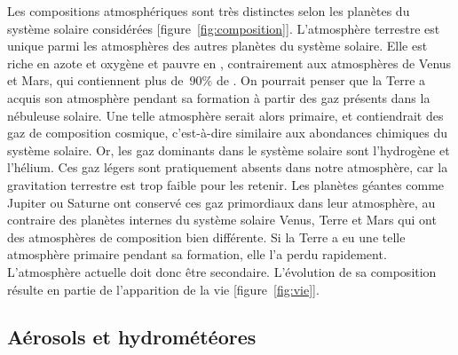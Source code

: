 
\sk
Les compositions atmosphériques sont très distinctes selon les planètes du système solaire considérées [figure~\ref{fig:composition}]. L'atmosphère terrestre est unique parmi les atmosphères des autres planètes du système solaire. Elle est riche en azote et oxygène et pauvre en \carb, contrairement aux atmosphères de Venus et Mars, qui contiennent plus de~$90\%$ de \carb. On pourrait penser que la Terre a acquis son atmosphère pendant sa formation à partir des gaz présents dans la nébuleuse solaire. Une telle atmosphère serait alors primaire, et contiendrait des gaz de composition cosmique, c'est-à-dire similaire aux abondances chimiques du système solaire. Or, les gaz dominants dans le système solaire sont l'hydrogène et l'hélium. Ces gaz légers sont pratiquement absents dans notre atmosphère, car la gravitation terrestre est trop faible pour les retenir. Les planètes géantes comme Jupiter ou Saturne ont conservé ces gaz primordiaux dans leur atmosphère, au contraire des planètes internes du système solaire Venus, Terre et Mars qui ont des atmosphères de composition bien différente. Si la Terre a eu une telle atmosphère primaire pendant sa formation, elle l'a perdu rapidement. L'atmosphère actuelle doit donc être secondaire. L'évolution de sa composition résulte en partie de l'apparition de la vie [figure~\ref{fig:vie}].


\sk
\subsection{Aérosols et hydrométéores}


